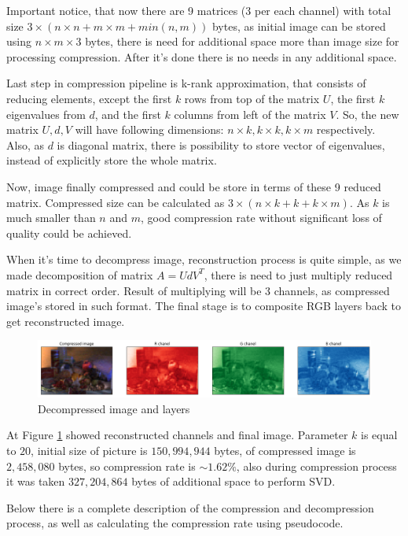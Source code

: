 Important notice, that now there are 9 matrices (3 per each channel) with total size $3 \times (n \times n + m \times m + min(n, m))$ bytes, as initial image can be stored using $n \times m \times 3$ bytes, there is need for additional space more than image size for processing compression. After it's done there is no needs in any additional space.

Last step in compression pipeline is k-rank approximation, that consists of reducing elements, except the first $k$ rows from top of the matrix $U$, the first $k$ eigenvalues from $d$, and the first $k$ columns from left of the matrix $V$. So, the new matrix $U, d, V$ will have following dimensions: $n \times k, k \times k, k \times m$ respectively. Also, as $d$ is diagonal matrix, there is possibility to store vector of eigenvalues, instead of explicitly store the whole matrix.

Now, image finally compressed and could be store in terms of these 9 reduced matrix. Compressed size can be calculated as $3 \times (n \times k + k + k \times m)$. As $k$ is much smaller than $n$ and $m$, good compression rate without significant loss of quality could be achieved.

When it's time to decompress image, reconstruction process is quite simple, as we made decomposition of matrix $A = U d V^T$, there is need to just multiply reduced matrix in correct order. Result of multiplying will be 3 channels, as compressed image's stored in such format. The final stage is to composite RGB layers back to get reconstructed image. 


\begin{figure}[H]
  \centering
  \includegraphics[width=\linewidth]{rgb_compressed.png}
  \caption{Decompressed image and layers}
  \label{fig:rgb_com}
\end{figure}

At Figure \ref{fig:rgb_com} showed reconstructed channels and final image. Parameter $k$ is equal to $20$, initial size of picture is $150,994,944$ bytes, of compressed image is $2,458,080$ bytes, so compression rate is $\sim 1.62\%$, also during compression process it was taken $327,204,864$ bytes of additional space to perform SVD. 

Below there is a complete description of the compression and decompression process, as well as calculating the compression rate using pseudocode.


